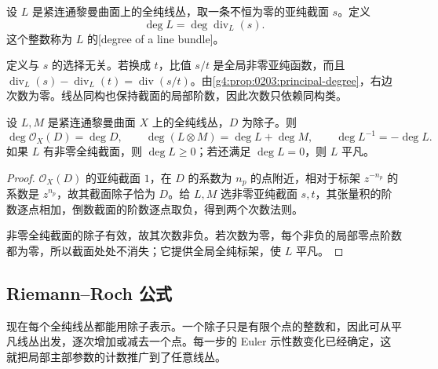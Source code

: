 \begin{definition}
	\label{g4:def:0304:line-bundle-degree}
	设 \(L\) 是紧连通黎曼曲面上的全纯线丛，取一条不恒为零的亚纯截面 \(s\)。定义
	\[
		\deg L=\deg\operatorname{div}_L(s).
	\]
	这个整数称为 \(L\) 的[degree of a line bundle]。
\end{definition}

定义与 \(s\) 的选择无关。若换成 \(t\)，比值 \(s/t\) 是全局非零亚纯函数，而且 \(\operatorname{div}_L(s)-\operatorname{div}_L(t)=\operatorname{div}(s/t)\)。由\cref{g4:prop:0203:principal-degree}，右边次数为零。线丛同构也保持截面的局部阶数，因此次数只依赖同构类。

\begin{proposition}
	\label{g4:prop:0304:degree-rules}
	设 \(L,M\) 是紧连通黎曼曲面 \(X\) 上的全纯线丛，\(D\) 为除子。则
	\[
		\deg\mathcal O_X(D)=\deg D,\qquad
		\deg(L\otimes M)=\deg L+\deg M,\qquad
		\deg L^{-1}=-\deg L.
	\]
	如果 \(L\) 有非零全纯截面，则 \(\deg L\ge0\)；若还满足 \(\deg L=0\)，则 \(L\) 平凡。
\end{proposition}
\begin{proof}
	\(\mathcal O_X(D)\) 的亚纯截面 \(1\)，在 \(D\) 的系数为 \(n_p\) 的点附近，相对于标架 \(z^{-n_p}\) 的系数是 \(z^{n_p}\)，故其截面除子恰为 \(D\)。给 \(L,M\) 选非零亚纯截面 \(s,t\)，其张量积的阶数逐点相加，倒数截面的阶数逐点取负，得到两个次数法则。

	非零全纯截面的除子有效，故其次数非负。若次数为零，每个非负的局部零点阶数都为零，所以截面处处不消失；它提供全局全纯标架，使 \(L\) 平凡。
\end{proof}

\subsection{Riemann–Roch 公式}
\label{g4:subsec:0304:04}

现在每个全纯线丛都能用除子表示。一个除子只是有限个点的整数和，因此可从平凡线丛出发，逐次增加或减去一个点。每一步的 Euler 示性数变化已经确定，这就把局部主部参数的计数推广到了任意线丛。


